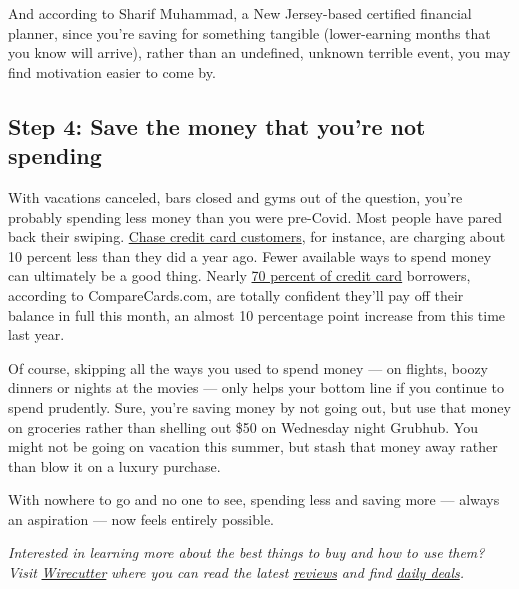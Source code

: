 And according to Sharif Muhammad, a New Jersey-based certified financial
planner, since you're saving for something tangible (lower-earning
months that you know will arrive), rather than an undefined, unknown
terrible event, you may find motivation easier to come by.

\hypertarget{step-4-save-the-money-that-youre-not-spending}{%
\subsection{Step 4: Save the money that you're not
spending}\label{step-4-save-the-money-that-youre-not-spending}}

With vacations canceled, bars closed and gyms out of the question,
you're probably spending less money than you were pre-Covid. Most people
have pared back their swiping.
\href{https://www.businessinsider.com/economic-outlook-credit-card-spending-data-recovery-stalling-recession-jpmorgan-2020-7}{Chase
credit card customers}, for instance, are charging about 10 percent less
than they did a year ago. Fewer available ways to spend money can
ultimately be a good thing. Nearly
\href{https://www.comparecards.com/blog/credit-card-confidence-index/}{70
percent of credit card} borrowers, according to CompareCards.com, are
totally confident they'll pay off their balance in full this month, an
almost 10 percentage point increase from this time last year.

Of course, skipping all the ways you used to spend money --- on flights,
boozy dinners or nights at the movies --- only helps your bottom line if
you continue to spend prudently. Sure, you're saving money by not going
out, but use that money on groceries rather than shelling out \$50 on
Wednesday night Grubhub. You might not be going on vacation this summer,
but stash that money away rather than blow it on a luxury purchase.

With nowhere to go and no one to see, spending less and saving more ---
always an aspiration --- now feels entirely possible.

\emph{Interested in learning more about the best things to buy and how
to use them? Visit}
\href{https://www.nytimes.com/wirecutter/?utm_source=nytimes\&utm_medium=referral\&utm_campaign=wcsmarterliving\&utm_content=covid-budget}{\emph{Wirecutter}}
\emph{where you can read the latest}
\href{https://www.nytimes.com/wirecutter/reviews?utm_source=nytimes\&utm_medium=referral\&utm_campaign=wcsmarterliving\&utm_content=covid-budget}{\emph{reviews}}
\emph{and find}
\href{https://www.nytimes.com/wirecutter/deals/?utm_source=nytimes\&utm_medium=referral\&utm_campaign=wcsmarterliving\&utm_content=covid-budget}{\emph{daily
deals}}\emph{.}

